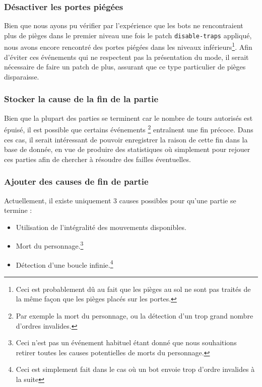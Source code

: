 \documentclass[a4paper,12pt]{article}
\begin{document}
\subsubsection{Désactiver les portes piégées}
Bien que nous ayons pu vérifier par l'expérience que les bots ne rencontraient
plus de pièges dans le premier niveau une fois le patch {\verb|disable-traps|}
appliqué, nous avons encore rencontré des portes piégées dans les niveaux
inférieurs\footnote{Ceci est probablement dû au fait que les pièges au sol ne
sont pas traités de la même façon que les pièges placés sur les portes.}. Afin
d'éviter ces événements qui ne respectent pas la présentation du mode, il serait
nécessaire de faire un patch de plus, assurant que ce type particulier de pièges
disparaisse.

\subsubsection{Stocker la cause de la fin de la partie}
Bien que la plupart des parties se terminent car le nombre de tours autorisés
est épuisé, il est possible que certains événements \footnote{Par exemple la
  mort du personnage, ou la détection d'un trop grand nombre d'ordres
  invalides.} entraînent une fin précoce. Dans ces cas, il serait intéressant
de pouvoir enregistrer la raison de cette fin dans la base de donnée, en vue de
produire des statistiques où simplement pour rejouer ces parties afin de
chercher à résoudre des failles éventuelles.

\subsubsection{Ajouter des causes de fin de partie}
Actuellement, il existe uniquement 3 causes possibles pour qu'une partie se
termine :
\begin{itemize}
\item Utilisation de l'intégralité des mouvements disponibles.
\item Mort du personnage.\footnote{Ceci n'est pas un événement habituel étant
  donné que nous souhaitions retirer toutes les causes potentielles de morts du
  personnage.}
\item Détection d'une boucle infinie.\footnote{Ceci est simplement fait dans le
  cas où un bot envoie trop d'ordre invalides à la suite}
\end{itemize}
\end{document}
